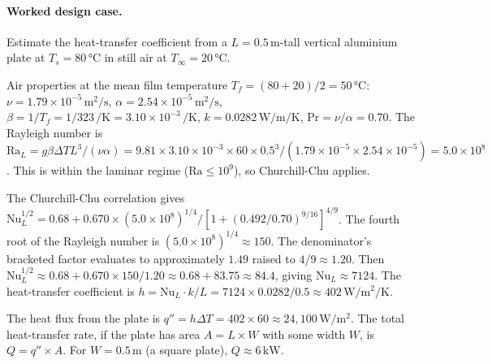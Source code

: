 \paragraph{Worked design case.} Estimate the heat-transfer
coefficient from a $L = 0.5 \,\si{\meter}$-tall vertical aluminium
plate at $T_{s} = 80 \,\si{\degreeCelsius}$ in still air at
$T_{\infty} = 20 \,\si{\degreeCelsius}$.

Air properties at the mean film temperature $T_{f} = (80 + 20)/2 =
50 \,\si{\degreeCelsius}$: $\nu = 1.79 \times 10^{-5} \,\si{\meter
\squared\per\second}$, $\alpha = 2.54 \times 10^{-5} \,\si{\meter
\squared\per\second}$, $\beta = 1/T_{f} = 1/323 \,\si{\per\kelvin}
= 3.10 \times 10^{-3} \,\si{\per\kelvin}$, $k = 0.0282
\,\si{\watt\per\meter\per\kelvin}$, $\mathrm{Pr} = \nu/\alpha = 0.70$.
The Rayleigh number is
$\mathrm{Ra}_{L} = g \beta \Delta T L^{3} / (\nu \alpha) =
9.81 \times 3.10 \times 10^{-3} \times 60 \times 0.5^{3} / (1.79
\times 10^{-5} \times 2.54 \times 10^{-5}) = 5.0 \times 10^{8}$.
This is within the laminar regime ($\mathrm{Ra} \leq 10^{9}$), so
Churchill-Chu applies.

The Churchill-Chu correlation gives
$\mathrm{Nu}_{L}^{1/2} = 0.68 + 0.670 \times (5.0 \times 10^{8})^{1/4}
/ [1 + (0.492/0.70)^{9/16}]^{4/9}$.
The fourth root of the Rayleigh number is
$(5.0 \times 10^{8})^{1/4} \approx 150$. The denominator's bracketed
factor evaluates to approximately $1.49$ raised to $4/9 \approx 1.20$.
Then $\mathrm{Nu}_{L}^{1/2} \approx 0.68 + 0.670 \times 150 / 1.20
\approx 0.68 + 83.75 \approx 84.4$, giving $\mathrm{Nu}_{L} \approx
7124$. The heat-transfer coefficient is
$h = \mathrm{Nu}_{L} \cdot k / L = 7124 \times 0.0282 / 0.5
\approx 402 \,\si{\watt\per\meter\squared\per\kelvin}$.

The heat flux from the plate is $q'' = h \Delta T = 402 \times 60
\approx 24{,}100 \,\si{\watt\per\meter\squared}$. The total
heat-transfer rate, if the plate has area $A = L \times W$ with
some width $W$, is $Q = q'' \times A$. For $W = 0.5 \,\si{\meter}$
(a square plate), $Q \approx 6 \,\si{\kilo\watt}$.

